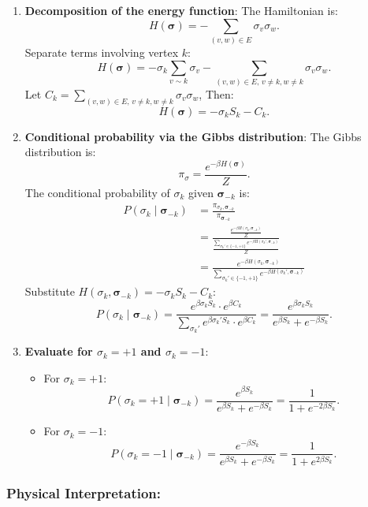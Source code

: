 \documentclass[11pt]{article}
\providecommand{\tightlist}{%
      \setlength{\itemsep}{0pt}\setlength{\parskip}{0pt}}
\begin{document}
\begin{enumerate}
\def\labelenumi{\arabic{enumi}.}
\item
  \textbf{Decomposition of the energy function}: The Hamiltonian is: \[
  H(\pmb{\sigma}) = -\sum_{(v,w) \in E} \sigma_v \sigma_w.
  \] Separate terms involving vertex \(k\): \[
  H(\pmb{\sigma}) = -\sigma_k \sum_{v \sim k} \sigma_v - \sum_{(v,w) \in E, \, v \neq k, w \neq k} \sigma_v \sigma_w.
  \] Let
  \(C_k = \sum_{(v,w) \in E, \, v \neq k, w \neq k} \sigma_v \sigma_w\),
  Then: \[
  H(\pmb{\sigma}) = -\sigma_k S_k - C_k.
  \]
\item
  \textbf{Conditional probability via the Gibbs distribution}: The Gibbs
  distribution is: \[
  \pi_{\sigma} = \frac{e^{-\beta H(\pmb{\sigma})}}{Z}.
  \] The conditional probability of \(\sigma_k\) given
  \(\pmb{\sigma}_{-k}\) is:
  \begin{align*}
   P(\sigma_k \mid \pmb{\sigma}_{-k})
   &=\frac{\pi_{\sigma_k, \pmb{\sigma}_{-k}}}{\pi_{\pmb{\sigma}_{-k}}}\\
   &=\frac{\frac{e^{-\beta H(\sigma_k, \pmb{\sigma}_{-k})}}{Z}}{\frac{\sum_{\sigma_k' \in \{-1, +1\}} e^{-\beta H(\sigma_k', \pmb{\sigma}_{-k})}}{Z}}\\
   &=\frac{e^{-\beta H(\sigma_k, \pmb{\sigma}_{-k})}}{\sum_{\sigma_k' \in \{-1, +1\}} e^{-\beta H(\sigma_k', \pmb{\sigma}_{-k})}}
   \end{align*}
  Substitute \(H(\sigma_k, \pmb{\sigma}_{-k}) = -\sigma_k S_k - C_k\):
  \[
  P(\sigma_k \mid \pmb{\sigma}_{-k}) = \frac{e^{\beta \sigma_k S_k} \cdot e^{\beta C_k}}{\sum_{\sigma_k'} e^{\beta \sigma_k' S_k} \cdot e^{\beta C_k}} = \frac{e^{\beta \sigma_k S_k}}{e^{\beta S_k} + e^{-\beta S_k}}.
  \]
\item
  \textbf{Evaluate for \(\sigma_k = +1\) and \(\sigma_k = -1\)}:

  \begin{itemize}
  \tightlist
  \item
    For \(\sigma_k = +1\): \[
    P(\sigma_k = +1 \mid \pmb{\sigma}_{-k}) = \frac{e^{\beta S_k}}{e^{\beta S_k} + e^{-\beta S_k}} = \frac{1}{1 + e^{-2\beta S_k}}.
    \]
  \item
    For \(\sigma_k = -1\): \[
    P(\sigma_k = -1 \mid \pmb{\sigma}_{-k}) = \frac{e^{-\beta S_k}}{e^{\beta S_k} + e^{-\beta S_k}} = \frac{1}{1 + e^{2\beta S_k}}.
    \]
  \end{itemize}
\end{enumerate}

\subsubsection{Physical Interpretation:}\label{physical-interpretation}
\end{document}
